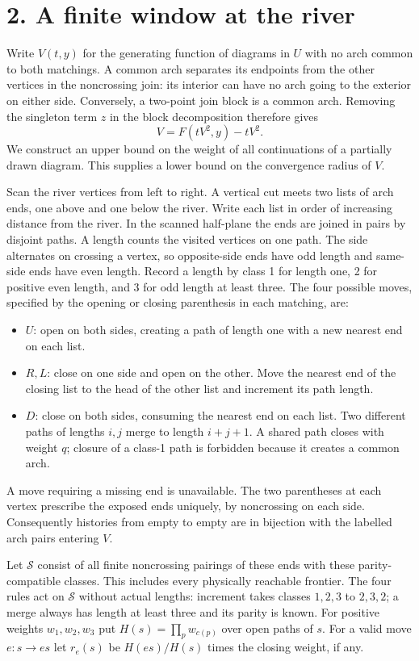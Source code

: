 \section*{2. A finite window at the river}
Write \(V(t,y)\) for the generating function of diagrams in \(U\) with
no arch common to both matchings. A common arch separates its endpoints
from the other vertices in the noncrossing join: its interior can have
no arch going to the exterior on either side. Conversely, a two-point
join block is a common arch. Removing the singleton term \(z\) in the
block decomposition therefore gives
\[
             V=F(tV^2,y)-tV^2.                                      \tag{3}
\]
We construct an upper bound on the weight of all continuations of a
partially drawn diagram. This supplies a lower bound on the convergence
radius of \(V\).

Scan the river vertices from left to right. A vertical cut meets two
lists of arch ends, one above and one below the river. Write each list
in order of increasing distance from the river. In the scanned half-plane
the ends are joined in pairs by disjoint paths. A length counts the
visited vertices on one path. The side alternates on crossing a vertex,
so opposite-side ends have odd length and same-side ends have even
length. Record a length by class 1 for length one, 2 for positive even
length, and 3 for odd length at least three. The four possible moves,
specified by the opening or closing parenthesis in each matching, are:
\begin{itemize}
\item \(U\): open on both sides, creating a path of length one with a
new nearest end on each list.
\item \(R,L\): close on one side and open on the other. Move the nearest
end of the closing list to the head of the other list and increment
its path length.
\item \(D\): close on both sides, consuming the nearest end on each
list. Two different paths of lengths \(i,j\) merge to length \(i+j+1\).
A shared path closes with weight \(q\); closure of a class-1 path is
forbidden because it creates a common arch.
\end{itemize}
A move requiring a missing end is unavailable. The two parentheses
at each vertex prescribe the exposed ends uniquely, by noncrossing
on each side. Consequently histories from empty to empty are in
bijection with the labelled arch pairs entering \(V\).

Let \(\mathcal S\) consist of all finite noncrossing pairings of these
ends with these parity-compatible classes. This includes every physically
reachable frontier. The four rules act on \(\mathcal S\) without actual
lengths: increment takes classes \(1,2,3\) to \(2,3,2\); a merge always
has length at least three and its parity is known. For positive weights
\(w_1,w_2,w_3\) put \(H(s)=\prod_p w_{c(p)}\) over open paths of \(s\).
For a valid move \(e:s\longrightarrow es\) let \(r_e(s)\) be
\(H(es)/H(s)\) times the closing weight, if any.

